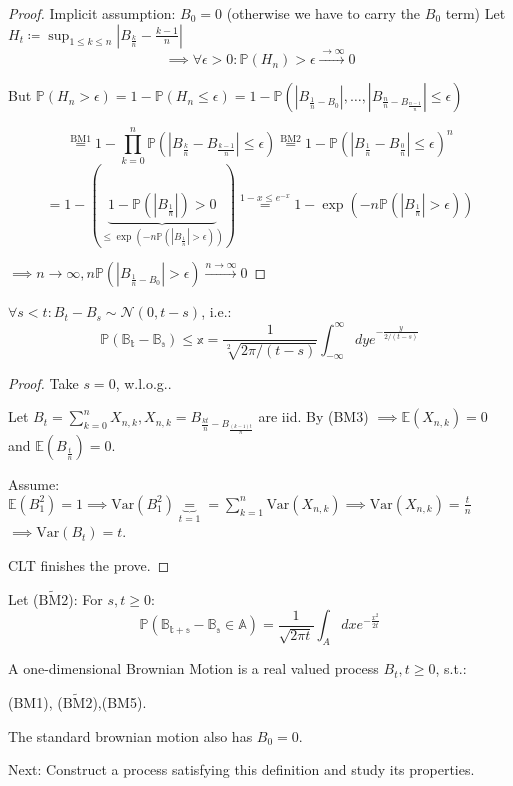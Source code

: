 \begin{proof}
    Implicit assumption: $B_0=0$ (otherwise we have to carry the $B_0$ term)
    Let $H_t\coloneqq \sup_{1\leq k \leq n}\left\vert B_{\frac{k}{n}}-\frac{k-1}{n} \right\vert$
    \[\implies \forall \epsilon >0: \mathbb{P}(H_n)>\epsilon\stackrel{\to \infty}{\rightarrow} 0\]

    But $\mathbb{P}(H_n> \epsilon)=1-\mathbb{P}(H_n \leq \epsilon)=1-\mathbb{P}(\left\vert B_{\frac{1}{n}-B_0} \right\vert,\dots,\left\vert B_{\frac{n}{n}-B_{\frac{n-1}{n}}} \right\vert\leq  \epsilon) $

    \[\stackrel{\text{BM1}}{=}1- \prod_{k=0}^n\mathbb{P}(\left\vert  B_{\frac{k}{n}}-B_{\frac{k-1}{n}} \right\vert \leq \epsilon) \stackrel{\text{BM2}}{=} 1-\mathbb{P}(\left\vert  B_{\frac{1}{n}}-B_{\frac{0}{n}} \right\vert \leq \epsilon)^n \]
    \[=1-(\underbrace{1-\mathbb{P}(\left\vert B_{\frac{1}{n}} \right\vert)>0}_{\leq \exp(-n \mathbb{P}(\left\vert B_{\frac{1}{n}} \right\vert>\epsilon))}) \stackrel{1-x\leq e^{-x}}{=}1-\exp(-n\mathbb{P}(\left\vert B_{\frac{1}{n}} \right\vert>\epsilon))\]

    $\implies n\to \infty, n\mathbb{P}(\left\vert B_{\frac{1}{n}-B_0} \right\vert>\epsilon) \stackrel{n\to\infty}{\rightarrow}0$

\end{proof}

\begin{lemma}
    $\forall s<t:B_t-B_s\sim \mathcal{N}(0,t-s)$, i.e.:
    \[\mathbb{P(B_t-B_s)\leq x}=\frac{1}{\sqrt[2]{2\pi/(t-s)}}\int_{-\infty}^\infty dy e^{-\frac{y}{2/(t-s)}}\]
\end{lemma}

\begin{proof}
    Take $s=0$, w.l.o.g..

    Let $B_t=\sum_{k=0}^n X_{n,k}, X_{n,k}=B_{\frac{kt}{n}-B_{\frac{(k-1)t}{n}}}$ are iid.
    By (BM3) $\implies \mathbb{E}(X_{n,k})=0$ and $\mathbb{E}(B_{\frac{t}{n}})=0$.

    Assume: $\mathbb{E}(B_1^2)=1 \implies \text{Var}(B_1^2)\underbrace{=}_{t=1}=\sum_{k=1}^n\text{Var}(X_{n,k})\implies \text{Var}(X_{n,k})=\frac{t}{n}$
    $\implies \text{Var}(B_t)=t$.

    CLT finishes the prove.

\end{proof}

Let ($\tilde{\text{BM2}}$): For $s,t\geq 0:$ \[\mathbb{P(B_{t+s}-B_s\in A)}=\frac{1}{\sqrt{2 \pi t}}\int_A dxe^{-\frac{x^2}{2t}}\]

\begin{definition}
    A one-dimensional Brownian Motion is a real valued process $B_t,t\geq 0$, s.t.:
    
    (BM1), ($\tilde{\text{BM2}}$),(BM5).
\end{definition}

\begin{remark}
    The standard brownian motion also has $B_0=0$.
\end{remark}

Next: Construct a process satisfying this definition and study its properties. 


